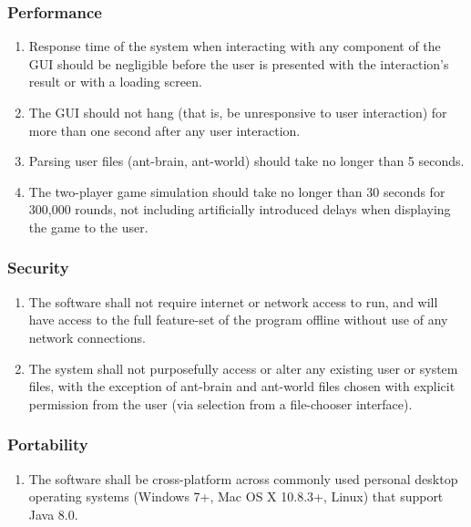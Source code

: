 \documentclass[11pt]{article}
\providecommand{\tightlist}{%
  \setlength{\itemsep}{0pt}\setlength{\parskip}{0pt}}
\begin{document}
\subsubsection{Performance}\label{performance}

\begin{enumerate}
\def\labelenumi{\arabic{enumi}.}
\tightlist
\item
  Response time of the system when interacting with any component of the
  GUI should be negligible before the user is presented with the
  interaction's result or with a loading screen.
\item
  The GUI should not hang (that is, be unresponsive to user interaction)
  for more than one second after any user interaction.
\item
  Parsing user files (ant-brain, ant-world) should take no longer than 5
  seconds.
\item
  The two-player game simulation should take no longer than 30 seconds
  for 300,000 rounds, not including artificially introduced delays when
  displaying the game to the user.
\end{enumerate}

\subsubsection{Security}\label{security}

\begin{enumerate}
\def\labelenumi{\arabic{enumi}.}
\tightlist
\item
  The software shall not require internet or network access to run, and
  will have access to the full feature-set of the program offline
  without use of any network connections.
\item
  The system shall not purposefully access or alter any existing user or
  system files, with the exception of ant-brain and ant-world files
  chosen with explicit permission from the user (via selection from a
  file-chooser interface).
\end{enumerate}

\subsubsection{Portability}\label{portability}

\begin{enumerate}
\def\labelenumi{\arabic{enumi}.}
\tightlist
\item
  The software shall be cross-platform across commonly used personal
  desktop operating systems (Windows 7+, Mac OS X 10.8.3+, Linux) that
  support Java 8.0.
\end{enumerate}
\end{document}
